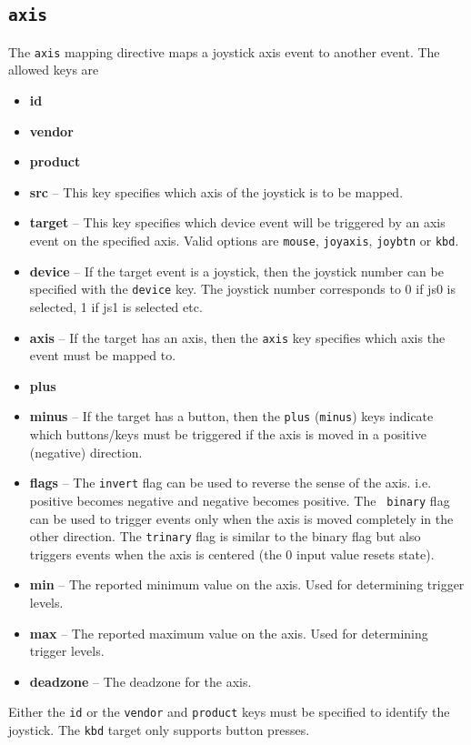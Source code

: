 \documentclass{article}
\begin{document}
\subsection{{\tt axis}}
The {\tt axis} mapping directive maps a joystick axis event 
to another event. The allowed keys are 
\begin{itemize}
	\item {\bf id}
	\item {\bf vendor}
	\item {\bf product}
	\item {\bf src} -- This key specifies which axis of the joystick is to be mapped.
	\item {\bf target} -- This key specifies which device event will be triggered
				by an axis event on the specified axis. Valid
				options are {\tt mouse}, {\tt joyaxis}, {\tt joybtn} or {\tt kbd}.
	\item {\bf device} -- If the target event is a joystick, then the joystick 
				number can be specified with the {\tt device} key.
				The joystick number corresponds to 0 if js0 is selected, 1 if js1 is selected etc.
	\item {\bf axis} -- If the target has an axis, then the {\tt axis} key specifies
				which axis the event must be mapped to.
	\item {\bf plus} 
	\item {\bf minus} -- If the target has a button, then the {\tt plus} ({\tt minus})
				keys indicate which buttons/keys must be triggered
				if the axis is moved in a positive (negative) direction.
	\item {\bf flags} -- The {\tt invert} flag can be used to reverse the sense of the
				axis. i.e. positive becomes negative and negative becomes positive. The {\tt
                binary} flag can be used to trigger events only when the axis is moved
                completely in the other direction. The {\tt trinary} flag is similar to the binary flag
                but also triggers events when the axis is centered (the 0 input value resets state).
    \item {\bf min} -- The reported minimum value on the axis. Used for determining trigger levels.
    \item {\bf max} -- The reported maximum value on the axis. Used for determining trigger levels.
    \item {\bf deadzone} -- The deadzone for the axis.
\end{itemize}
Either the {\tt id} or the {\tt vendor} and {\tt product} keys must be specified to identify the
joystick. The {\tt kbd} target only supports button presses.
\end{document}
